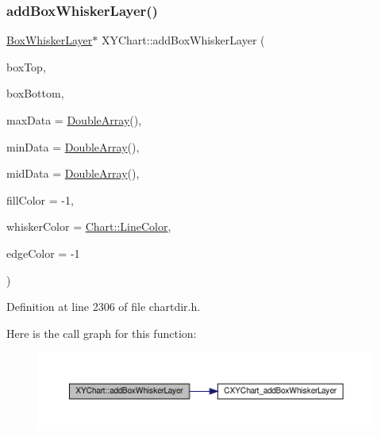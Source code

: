 \subsubsection{\texorpdfstring{add\+Box\+Whisker\+Layer()}{addBoxWhiskerLayer()}}
{\footnotesize\ttfamily \hyperlink{class_box_whisker_layer}{Box\+Whisker\+Layer}$\ast$ X\+Y\+Chart\+::add\+Box\+Whisker\+Layer (\begin{DoxyParamCaption}\item[{\hyperlink{class_double_array}{Double\+Array}}]{box\+Top,  }\item[{\hyperlink{class_double_array}{Double\+Array}}]{box\+Bottom,  }\item[{\hyperlink{class_double_array}{Double\+Array}}]{max\+Data = {\ttfamily \hyperlink{class_double_array}{Double\+Array}()},  }\item[{\hyperlink{class_double_array}{Double\+Array}}]{min\+Data = {\ttfamily \hyperlink{class_double_array}{Double\+Array}()},  }\item[{\hyperlink{class_double_array}{Double\+Array}}]{mid\+Data = {\ttfamily \hyperlink{class_double_array}{Double\+Array}()},  }\item[{int}]{fill\+Color = {\ttfamily -\/1},  }\item[{int}]{whisker\+Color = {\ttfamily \hyperlink{namespace_chart_abee0d882fdc9ad0b001245ad9fc64011a04817a359476e87a5c572a7a69cdaaec}{Chart\+::\+Line\+Color}},  }\item[{int}]{edge\+Color = {\ttfamily -\/1} }\end{DoxyParamCaption})\hspace{0.3cm}{\ttfamily [inline]}}



Definition at line 2306 of file chartdir.\+h.

Here is the call graph for this function\+:
\nopagebreak
\begin{figure}[H]
\begin{center}
\leavevmode
\includegraphics[width=350pt]{class_x_y_chart_ab1da3dced1b6702fb3e230f6d3a94a05_cgraph}
\end{center}
\end{figure}
\mbox{\label{class_x_y_chart_a43f380553d11ccc29b1e06dbaa85f49b}} 
